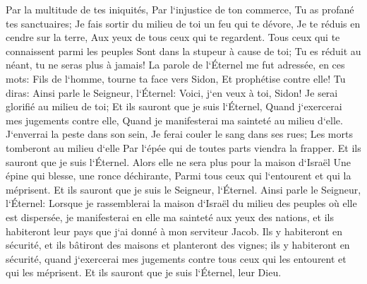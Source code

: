 \verse Par la multitude de tes iniquités, Par l`injustice de ton commerce, Tu as profané tes sanctuaires; Je fais sortir du milieu de toi un feu qui te dévore, Je te réduis en cendre sur la terre, Aux yeux de tous ceux qui te regardent. 
\verse Tous ceux qui te connaissent parmi les peuples Sont dans la stupeur à cause de toi; Tu es réduit au néant, tu ne seras plus à jamais! 
\verse La parole de l`Éternel me fut adressée, en ces mots: 
\verse Fils de l`homme, tourne ta face vers Sidon, Et prophétise contre elle! 
\verse Tu diras: Ainsi parle le Seigneur, l`Éternel: Voici, j`en veux à toi, Sidon! Je serai glorifié au milieu de toi; Et ils sauront que je suis l`Éternel, Quand j`exercerai mes jugements contre elle, Quand je manifesterai ma sainteté au milieu d`elle. 
\verse J`enverrai la peste dans son sein, Je ferai couler le sang dans ses rues; Les morts tomberont au milieu d`elle Par l`épée qui de toutes parts viendra la frapper. Et ils sauront que je suis l`Éternel. 
\verse Alors elle ne sera plus pour la maison d`Israël Une épine qui blesse, une ronce déchirante, Parmi tous ceux qui l`entourent et qui la méprisent. Et ils sauront que je suis le Seigneur, l`Éternel. 
\verse Ainsi parle le Seigneur, l`Éternel: Lorsque je rassemblerai la maison d`Israël du milieu des peuples où elle est dispersée, je manifesterai en elle ma sainteté aux yeux des nations, et ils habiteront leur pays que j`ai donné à mon serviteur Jacob. 
\verse Ils y habiteront en sécurité, et ils bâtiront des maisons et planteront des vignes; ils y habiteront en sécurité, quand j`exercerai mes jugements contre tous ceux qui les entourent et qui les méprisent. Et ils sauront que je suis l`Éternel, leur Dieu. 

